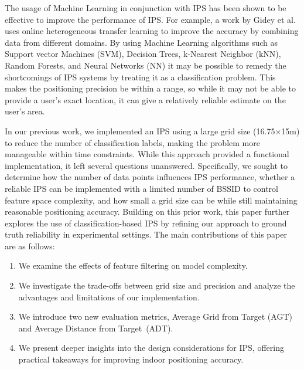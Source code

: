 \documentclass[runningheads]{llncs}
\begin{document}
The usage of Machine Learning in conjunction with IPS has been shown to be effective to improve the performance of IPS. For example, a work by Gidey et al. \cite{bgp3} uses online heterogeneous transfer learning to improve the accuracy by combining data from different domains. By using Machine Learning algorithms such as Support vector Machines (SVM), Decision Trees, k-Nearest Neighbor (kNN), Random Forests, and Neural Networks (NN) it may be possible to remedy the shortcomings of IPS systems by treating it as a classification problem. This makes the positioning precision be within a range, so while it may not be able to provide a user's exact location, it can give a relatively reliable estimate on the user's area.

In our previous work, we implemented an IPS using a large grid size (16.75×15m) to reduce the number of classification labels, making the problem more manageable within time constraints. While this approach provided a functional implementation, it left several questions unanswered. Specifically, we sought to determine how the number of data points influences IPS performance, whether a reliable IPS can be implemented with a limited number of BSSID to control feature space complexity, and how small a grid size can be while still maintaining reasonable positioning accuracy.
Building on this prior work, this paper further explores the use of classification-based IPS by refining our approach to ground truth reliability in experimental settings. The main contributions of this paper are as follows:
\begin{enumerate}
	\item We examine the effects of feature filtering on model complexity.
	\item We investigate the trade-offs between grid size and precision and analyze the advantages and limitations of our implementation.
	\item We introduce two new evaluation metrics, Average Grid from Target (AGT) and Average Distance from Target~(ADT).
	\item We present deeper insights into the design considerations for IPS, offering practical takeaways for improving indoor positioning accuracy.
\end{enumerate}

\end{document}
